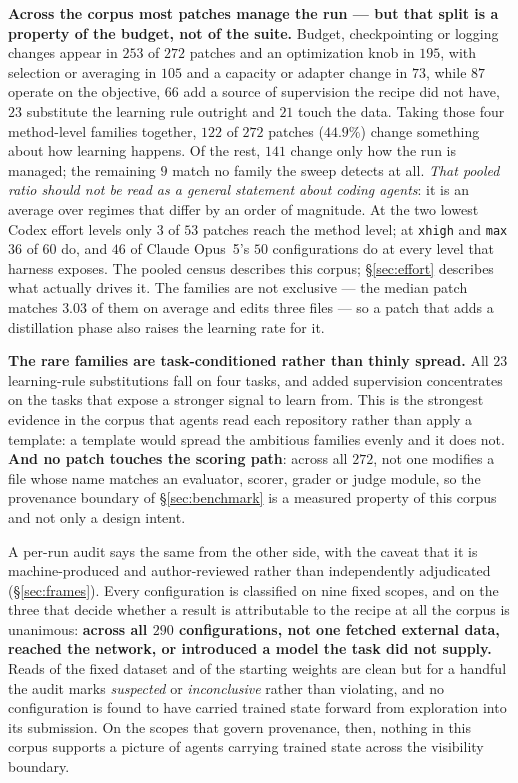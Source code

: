 \textbf{Across the corpus most patches manage the run --- but that split is a property of the
budget, not of the suite.} Budget, checkpointing or logging changes appear in $253$ of $272$ patches
and an optimization knob in $195$, with selection or averaging in $105$ and a capacity or
adapter change in $73$, while $87$ operate on the objective, $66$ add a source of supervision the
recipe did not have, $23$ substitute the learning rule outright and $21$ touch the
data. Taking those four method-level families together, $122$ of $272$ patches ($44.9\%$) change something about how learning
happens. Of the rest, $141$ change only how the run is managed; the remaining $9$ match no family the
sweep detects at all. \emph{That pooled
ratio should not be read as a general statement about coding agents}: it is an average over regimes
that differ by an order of magnitude. At the two lowest Codex effort levels only $3$ of $53$ patches
reach the method level; at \texttt{xhigh} and \texttt{max} $36$ of $60$ do, and $46$ of Claude
Opus~5's $50$ configurations do at every level that harness exposes. The pooled census describes this
corpus; \S\ref{sec:effort} describes what actually drives it. The families are not exclusive --- the median patch matches
$3.03$ of them on average and edits three files --- so a patch that adds a distillation phase also raises the
learning rate for it.

\textbf{The rare families are task-conditioned rather than thinly spread.} All $23$ learning-rule
substitutions fall on four tasks, and added supervision concentrates on the tasks that expose a
stronger signal to learn from. This is the strongest evidence in the corpus that agents read each
repository rather than apply a template: a template would spread the ambitious families evenly and
it does not. \textbf{And no patch touches the scoring path}: across all $272$, not one modifies a file
whose name matches an evaluator, scorer, grader or judge module, so the provenance boundary of
\S\ref{sec:benchmark} is a measured property of this corpus and not only a design intent.

A per-run audit says the same from the other side, with the caveat that it is
machine-produced and author-reviewed rather than independently adjudicated (\S\ref{sec:frames}). Every
configuration is classified on nine fixed scopes, and on the three that decide whether a result is
attributable to the recipe at all the corpus is unanimous: \textbf{across all $290$ configurations, not
one fetched external data, reached the network, or introduced a model the task did not supply.} Reads of the fixed
dataset and of the starting weights are clean but for a handful the audit marks \emph{suspected} or
\emph{inconclusive} rather than violating, and no configuration is found to have carried trained state
forward from exploration into its submission. On the scopes that govern provenance, then, nothing in this corpus supports a
picture of agents carrying trained state across the visibility boundary.

